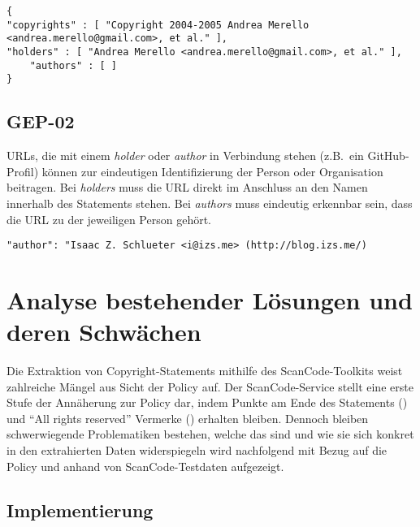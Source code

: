 \begin{lstlisting}[numbers=none, keepspaces=true]
{
"copyrights" : [ "Copyright 2004-2005 Andrea Merello <andrea.merello@gmail.com>, et al." ],
"holders" : [ "Andrea Merello <andrea.merello@gmail.com>, et al." ],
    "authors" : [ ]
}
\end{lstlisting}


\subsection{GEP-02}\label{subsec:gep-02}

URLs, die mit einem \textit{holder} oder \textit{author} in Verbindung stehen (z.B.\ ein GitHub-Profil) können zur eindeutigen Identifizierung der Person oder Organisation beitragen.
Bei \textit{holders} muss die URL direkt im Anschluss an den Namen innerhalb des Statements stehen.
Bei \textit{authors} muss eindeutig erkennbar sein, dass die URL zu der jeweiligen Person gehört.

\begin{lstlisting}[numbers=none, keepspaces=true]
"author": "Isaac Z. Schlueter <i@izs.me> (http://blog.izs.me/)
\end{lstlisting}


\section{Analyse bestehender Lösungen und deren Schwächen}\label{sec:analyse-bestehender-losungen}

Die Extraktion von Copyright-Statements mithilfe des ScanCode-Toolkits weist zahlreiche Mängel aus Sicht der Policy auf.
Der ScanCode-Service stellt eine erste Stufe der Annäherung zur Policy dar, indem Punkte am Ende des Statements () und \enquote{All rights reserved} Vermerke () erhalten bleiben.
Dennoch bleiben schwerwiegende Problematiken bestehen, welche das sind und wie sie sich konkret in den extrahierten Daten widerspiegeln wird nachfolgend mit Bezug auf die Policy und anhand von ScanCode-Testdaten aufgezeigt.

\subsection{Implementierung}

